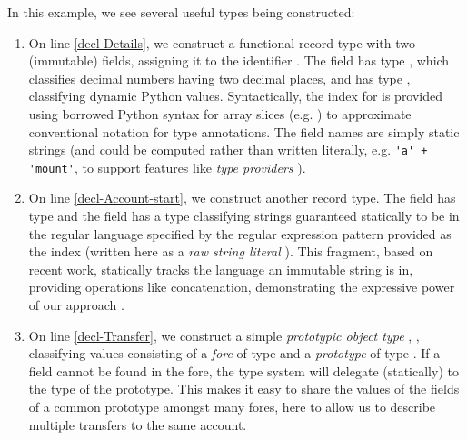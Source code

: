 In this example, we see several useful types being constructed:
\begin{enumerate}
\item On line \ref{decl-Details}, we construct a functional record type with two (immutable) fields, assigning it to the identifier . The field  has type , which classifies decimal numbers having two decimal places, and  has type , classifying dynamic Python values.  %
Syntactically, the index for  is provided using borrowed Python  syntax for array slices (e.g. ) to approximate conventional notation for type annotations. The field names are simply static strings (and could be computed rather than written literally, e.g. \lstinline{'a' + 'mount'}, to support features like \emph{type providers} \cite{Syme:2013:TIF:2429376.2429378}). 
\item On line \ref{decl-Account-start}, we construct another record type. The field  has type  and the field  has a type classifying strings guaranteed statically to be in the regular language specified  by the  regular expression pattern provided as the index (written here as a \emph{raw string literal} \cite{python}). This  fragment, based on recent work, statically tracks the language an immutable string is in, providing operations like concatenation, demonstrating the expressive power of our approach \cite{fulton-thesis}. %
\item 
On line \ref{decl-Transfer}, we construct a simple \emph{prototypic object type} \cite{Lie86}, , classifying values consisting of a \emph{fore} of type  and a \emph{prototype} of type . %
 If a field cannot be found in the fore, the type system will delegate (statically) to the type of the prototype. This makes it easy to share the values of the fields of a common prototype amongst many fores, here to allow us to describe multiple transfers to the same account.%
\end{enumerate}

